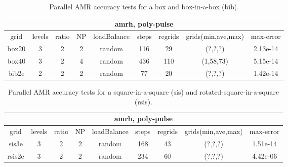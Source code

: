 \begin{table}[hbt]
\begin{center}\footnotesize
\begin{tabular}{|c|c|c|c|c|c|c|c|c|} \hline 
 \multicolumn{9}{|c|}{amrh, poly-pulse} \\\hline
  grid      & levels & ratio &  NP  &  loadBalance &  steps & regrids & grids(min,ave,max)& max-error \\ \hline
box20      &    3   &  2   &  2  & random        & 116  & 29    & (?,?,?)& 2.13e-14 \\
\hline
box40      &    3   &  2   &  4  & random        & 436  & 110    & (1,58,73) & 5.15e-14 \\
\hline
bib2e      &    2   &  2   &  2  & random        & 77  & 20    & (?,?,?)& 1.42e-14 \\
\hline
\end{tabular}		
\end{center}		
\caption{Parallel AMR accuracy tests for a box and box-in-a-box (bib).}
 \label{tab:parallelAccuracyBox} 
\end{table}

\begin{table}[hbt]
\begin{center}\footnotesize
\begin{tabular}{|c|c|c|c|c|c|c|c|c|} \hline 
 \multicolumn{9}{|c|}{amrh, poly-pulse} \\\hline
  grid      & levels & ratio &  NP  &  loadBalance &  steps & regrids & grids(min,ave,max)& max-error \\ \hline
sis3e       &    3   &  2   &  2  & random        & 168  & 43    & (?,?,?) & 1.51e-14 \\
\hline
rsis2e      &    3   &  2   &  2  & random        & 234  & 60    & (?,?,?) & 4.42e-06 \\
\hline
\end{tabular}		
\end{center}		
\caption{Parallel AMR accuracy tests for a square-in-a-square (sis) and rotated-square-in-a-square (rsis).}
 \label{tab:parallelAccuracySquare} 
\end{table}

